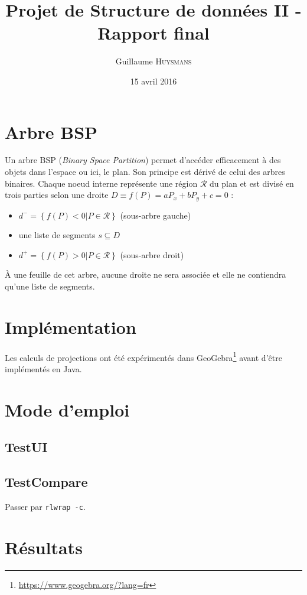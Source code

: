\documentclass{article}
\title{Projet de Structure de données II - Rapport final}
\author{Guillaume \textsc{Huysmans}}
\date{15 avril 2016}
\newcommand{\reg}{\mathcal{R}}
\newcommand{\inc}{\subseteq}
\begin{document}
\maketitle


\section{Arbre BSP}
Un arbre BSP (\textit{Binary Space Partition}) permet d'accéder efficacement
à des objets dans l'espace ou ici, le plan. Son principe est dérivé de celui
des arbres binaires. Chaque noeud interne représente une région $\reg$
du plan et est divisé en trois parties selon
une droite $D\equiv f(P)=aP_x+bP_y+c=0$ :
\begin{itemize}
	\item $d^-=\left\{f(P)<0|P\in\reg\right\}$ (sous-arbre gauche)
	\item une liste de segments $s \inc D$
	\item $d^+=\left\{f(P)>0|P\in\reg\right\}$ (sous-arbre droit)
\end{itemize}

À une feuille de cet arbre, aucune droite ne sera associée et elle ne
contiendra qu'une liste de segments.


\section{Implémentation}
Les calculs de projections ont été expérimentés dans
GeoGebra\footnote{\url{https://www.geogebra.org/?lang=fr}}
avant d'être implémentés en Java.


\section{Mode d'emploi}
\subsection{TestUI}
\subsection{TestCompare}
Passer par \texttt{rlwrap -c}.


\section{Résultats}
\end{document}
